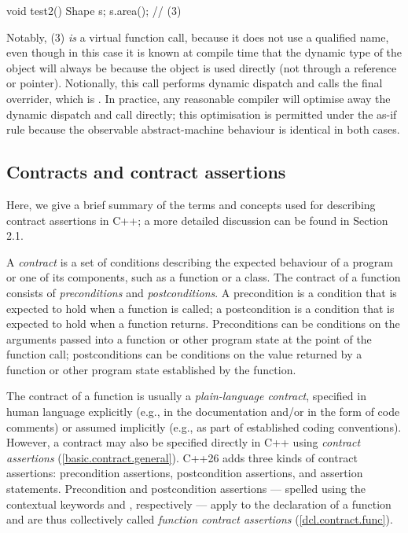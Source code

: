 \begin{codeblock}
void test2() {
  Shape s;
  s.area(); // (3)
}
\end{codeblock}

Notably, (3) \emph{is} a virtual function call, because it does not use a qualified name, even though in this case it is known at compile time that the dynamic type of the object  will always be  because the object is used directly (not through a reference or pointer). Notionally, this call performs dynamic dispatch and calls the final overrider, which is . In practice, any reasonable compiler will optimise away the dynamic dispatch and call  directly; this optimisation is permitted under the as-if rule because the observable abstract-machine behaviour is identical in both cases.

\subsection{Contracts and contract assertions}

Here, we give a brief summary of the terms and concepts used for describing contract assertions in C++; a more detailed discussion can be found in \cite{P2900R14} Section 2.1.

A \emph{contract} is a set of conditions describing the expected behaviour of a program or one of its components, such as a function or a class. The contract of a function consists of \emph{preconditions} and \emph{postconditions}. A precondition is a condition that is expected to hold when a function is called; a postcondition is a condition that is expected to hold when a function returns. Preconditions can be conditions on the arguments passed into a function or other program state at the point of the function call; postconditions can be conditions on the value returned by a function or other program state established by the function.

The contract of a function is usually a \emph{plain-language contract}, specified in human language explicitly (e.g., in the documentation and/or in the form of code comments) or assumed implicitly (e.g., as part of established coding conventions). However, a contract may also be specified directly in C++ using  \emph{contract assertions} (\href{https://eel.is/c++draft/basic.contract.general}{[basic.contract.general]}).
C++26 adds three kinds of contract assertions: precondition assertions, postcondition assertions, and assertion statements. Precondition and postcondition assertions --- spelled using the contextual keywords  and , respectively --- apply to the declaration of a function and are thus collectively called \emph{function contract assertions} (\href{https://eel.is/c++draft/dcl.contract.func}{[dcl.contract.func]}).

